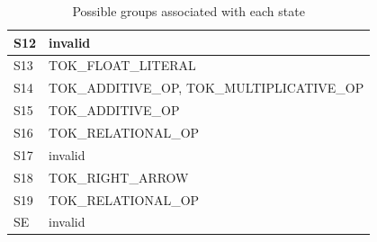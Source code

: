 \begin{table}[H]
\begin{tabular}{|l|l|}
S12 & invalid \\ \hline
S13 & TOK\_FLOAT\_LITERAL \\ \hline
S14 & TOK\_ADDITIVE\_OP, TOK\_MULTIPLICATIVE\_OP \\ \hline
S15 & TOK\_ADDITIVE\_OP \\ \hline
S16 & TOK\_RELATIONAL\_OP \\ \hline
S17 & invalid \\ \hline
S18 & TOK\_RIGHT\_ARROW \\ \hline
S19 & TOK\_RELATIONAL\_OP \\ \hline
SE & invalid \\ \hline
\end{tabular}
\caption{Possible groups associated with each state}
\label{table:token type}
\end{table}


